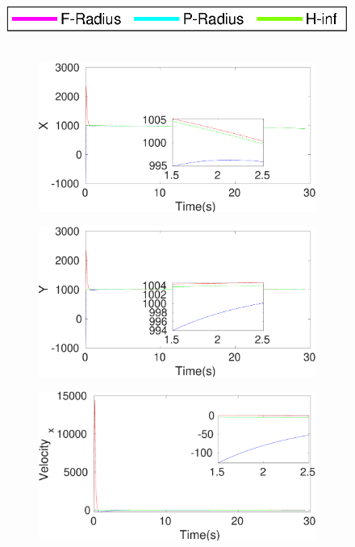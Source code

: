 \begin{figure}[h]
\includegraphics[scale=0.8]{figures/ratelegend}\\\\
\begin{subfigure}{.5\linewidth}
\centering
\includegraphics[width=\linewidth]{figures/HInf/s3pmHInfX}
\end{subfigure}
\begin{subfigure}{.5\linewidth}
\centering
\includegraphics[width=\linewidth]{figures/HInf/s3pmHInfY}
\end{subfigure}
\begin{subfigure}{.5\linewidth}
\centering
\includegraphics[width=\linewidth]{figures/HInf/s3pmHInfVelocity_x}

\end{subfigure}
\end{figure}
